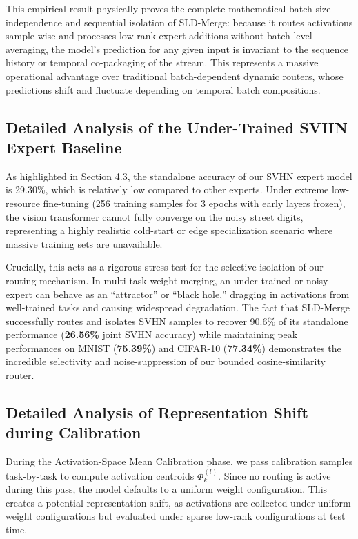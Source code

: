 \documentclass{article}
\theoremstyle{plain}
\theoremstyle{definition}
\theoremstyle{remark}
\begin{document}
This empirical result physically proves the complete mathematical batch-size independence and sequential isolation of SLD-Merge: because it routes activations sample-wise and processes low-rank expert additions without batch-level averaging, the model's prediction for any given input is invariant to the sequence history or temporal co-packaging of the stream. This represents a massive operational advantage over traditional batch-dependent dynamic routers, whose predictions shift and fluctuate depending on temporal batch compositions.

\subsection{Detailed Analysis of the Under-Trained SVHN Expert Baseline}
\label{sec:appendix_svhn}
As highlighted in Section 4.3, the standalone accuracy of our SVHN expert model is 29.30\%, which is relatively low compared to other experts. Under extreme low-resource fine-tuning (256 training samples for 3 epochs with early layers frozen), the vision transformer cannot fully converge on the noisy street digits, representing a highly realistic cold-start or edge specialization scenario where massive training sets are unavailable. 

Crucially, this acts as a rigorous stress-test for the selective isolation of our routing mechanism. In multi-task weight-merging, an under-trained or noisy expert can behave as an ``attractor'' or ``black hole,'' dragging in activations from well-trained tasks and causing widespread degradation. The fact that SLD-Merge successfully routes and isolates SVHN samples to recover 90.6\% of its standalone performance (\textbf{26.56\%} joint SVHN accuracy) while maintaining peak performances on MNIST (\textbf{75.39\%}) and CIFAR-10 (\textbf{77.34\%}) demonstrates the incredible selectivity and noise-suppression of our bounded cosine-similarity router.

\subsection{Detailed Analysis of Representation Shift during Calibration}
\label{sec:appendix_rep_shift}
During the Activation-Space Mean Calibration phase, we pass calibration samples task-by-task to compute activation centroids $\Phi_k^{(l)}$. Since no routing is active during this pass, the model defaults to a uniform weight configuration. This creates a potential representation shift, as activations are collected under uniform weight configurations but evaluated under sparse low-rank configurations at test time.
\end{document}
